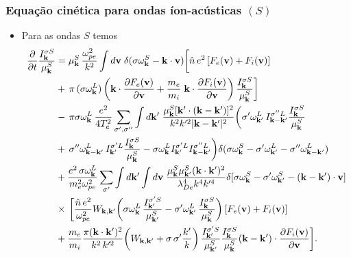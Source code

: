 \documentclass[10pt,aspectratio=1610,lualatex]{beamer}
\begin{document}
\begin{frame}
  \frametitle{Equação cinética para ondas íon-acústicas $(S)$}
  \begin{itemize}
  \item Para as ondas $S$ temos
    \begin{equation*}
      \label{S}
      \begin{split}
	\frac{\partial}{\partial t}\frac{I_{\bf k}^{\sigma S}}{\mu_{\bf k}^S}
	&=\mu_{\bf k}^S\,\frac{\omega_{pe}^2}{k^2} \int d{\bf v}\;
	\delta(\sigma\omega_{\bf k}^S-{\bf k}\cdot{\bf v})
	\biggl[\hat{n}\,e^2\,[F_e({\bf v})+F_i({\bf v})]\\
	&+\,\pi\,(\sigma\omega_{\bf k}^L)\,\biggl({\bf k}\cdot
	\frac{\partial F_e({\bf v})}{\partial{\bf v}}
	+\frac{m_e}{m_i}\;{\bf k}\cdot
	\frac{\partial F_i({\bf v})}{\partial{\bf v}}\biggr)\,
	\frac{I_{\bf k}^{\sigma S}}{\mu_{\bf k}^S}\biggr]\\
	&-\,\pi\sigma\omega_{\bf k}^L\,\frac{e^2}{4T_e^2}
	\sum_{\sigma ',\sigma ''}\int d{\bf k'}\;
	\frac{\mu_{\bf k}^S[{\bf k'}
	  \cdot({\bf k}-{\bf k}')]^2}{k^2k'^2|{\bf k}-{\bf k}'|^2}
	\biggl(\sigma '	\omega_{{\bf k}'}^L\, I_{{\bf k}-{\bf k}'}^{\sigma ''L}
	\frac{I_{\bf k}^{\sigma S}}{\mu_{\bf k}^S}\\
	&+\,\sigma ''\omega_{{\bf k}-{\bf k}'}^L \,
	I_{{\bf k}'}^{\sigma 'L}\frac{I_{\bf k}^{\sigma S}}{\mu_{\bf k}^S}
	-\sigma\omega_{\bf k}^LI_{{\bf k}'}^{\sigma 'L}
	I_{{\bf k}-{\bf k}'}^{\sigma ''L}\biggr)
	\delta(\sigma\omega_{\bf k}^S-\sigma '\omega_{{\bf k}'}^L
	-\sigma ''\omega_{{\bf k}-{\bf k}'}^L)\\
	&+\frac{e^2\,\sigma\omega_{\bf k}^L}{m_e^2\omega_{pe}^2}
	\sum_{\sigma '} \int d{\bf k'}\int d{\bf v}\;
	\frac{\mu_{\bf k}^S\mu_{{\bf k '}}^S({\bf k}\cdot{\bf k}')^2}
	{\lambda_{De}^4k^4k'^4} \delta[\sigma\omega_{\bf k}^S-\sigma '
	\omega_{{\bf k}'}^S-({\bf k}-{\bf k}')\cdot{\bf v}]\\
	&\times\,\biggl[\frac{\hat{n}\,e^2}{\omega_{pe}^2}
	W_{{\bf k},{\bf k}'} \biggl(\sigma\omega_{\bf k}^L\,
	\frac{I_{{\bf k}'}^{\sigma 'S}}{\mu_{{\bf k}'}^S}
	-\sigma '\omega_{{\bf k}'}^L\,
	\frac{I_{\bf k}^{\sigma S}}{\mu_{\bf k}^S}\biggr)\,
	[F_e({\bf v})+F_i({\bf v})]\\
	&+\frac{m_e}{m_i}\frac{\pi({\bf k}\cdot{\bf k}')^2}{k^2\,k'^2}
	\biggl(W_{{\bf k},{\bf k}'}+\sigma\,\sigma ' \frac{k'}{k}\biggr)\,
	\frac{I_{{\bf k}'}^{\sigma 'S}}{\mu_{{\bf k}'}^S}
	\frac{I_{\bf k}^{\sigma S}}{\mu_{\bf k}^S}({\bf k}-{\bf k}')
	\cdot\frac{\partial F_i({\bf v})}{\partial{\bf v}}\biggr].
      \end{split}
    \end{equation*}
  \end{itemize}
\end{frame}
\end{document}
